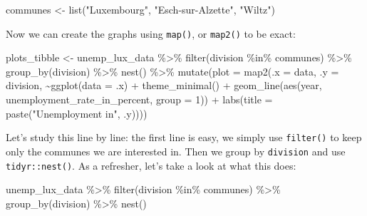 \documentclass[
]{article}
\newenvironment{Shaded}{\begin{snugshade}}{\end{snugshade}}
\newcommand{\AttributeTok}[1]{\textcolor[rgb]{0.77,0.63,0.00}{#1}}
\newcommand{\DecValTok}[1]{\textcolor[rgb]{0.00,0.00,0.81}{#1}}
\newcommand{\FunctionTok}[1]{\textcolor[rgb]{0.00,0.00,0.00}{#1}}
\newcommand{\NormalTok}[1]{#1}
\newcommand{\OtherTok}[1]{\textcolor[rgb]{0.56,0.35,0.01}{#1}}
\newcommand{\SpecialCharTok}[1]{\textcolor[rgb]{0.00,0.00,0.00}{#1}}
\newcommand{\StringTok}[1]{\textcolor[rgb]{0.31,0.60,0.02}{#1}}
\begin{document}
\begin{Shaded}
\begin{Highlighting}[]
\NormalTok{communes }\OtherTok{\textless{}{-}} \FunctionTok{list}\NormalTok{(}\StringTok{"Luxembourg"}\NormalTok{, }\StringTok{"Esch{-}sur{-}Alzette"}\NormalTok{, }\StringTok{"Wiltz"}\NormalTok{)}
\end{Highlighting}
\end{Shaded}

Now we can create the graphs using \texttt{map()}, or \texttt{map2()} to be exact:

\begin{Shaded}
\begin{Highlighting}[]
\NormalTok{plots\_tibble }\OtherTok{\textless{}{-}}\NormalTok{ unemp\_lux\_data }\SpecialCharTok{\%\textgreater{}\%}
  \FunctionTok{filter}\NormalTok{(division }\SpecialCharTok{\%in\%}\NormalTok{ communes) }\SpecialCharTok{\%\textgreater{}\%}
  \FunctionTok{group\_by}\NormalTok{(division) }\SpecialCharTok{\%\textgreater{}\%}
  \FunctionTok{nest}\NormalTok{() }\SpecialCharTok{\%\textgreater{}\%}
  \FunctionTok{mutate}\NormalTok{(}\AttributeTok{plot =} \FunctionTok{map2}\NormalTok{(}\AttributeTok{.x =}\NormalTok{ data, }\AttributeTok{.y =}\NormalTok{ division, }\SpecialCharTok{\textasciitilde{}}\FunctionTok{ggplot}\NormalTok{(}\AttributeTok{data =}\NormalTok{ .x) }\SpecialCharTok{+}
       \FunctionTok{theme\_minimal}\NormalTok{() }\SpecialCharTok{+}
       \FunctionTok{geom\_line}\NormalTok{(}\FunctionTok{aes}\NormalTok{(year, unemployment\_rate\_in\_percent, }\AttributeTok{group =} \DecValTok{1}\NormalTok{)) }\SpecialCharTok{+}
       \FunctionTok{labs}\NormalTok{(}\AttributeTok{title =} \FunctionTok{paste}\NormalTok{(}\StringTok{"Unemployment in"}\NormalTok{, .y))))}
\end{Highlighting}
\end{Shaded}

Let's study this line by line: the first line is easy, we simply use \texttt{filter()} to keep only the
communes we are interested in. Then we group by \texttt{division} and use \texttt{tidyr::nest()}. As a refresher,
let's take a look at what this does:

\begin{Shaded}
\begin{Highlighting}[]
\NormalTok{unemp\_lux\_data }\SpecialCharTok{\%\textgreater{}\%}
  \FunctionTok{filter}\NormalTok{(division }\SpecialCharTok{\%in\%}\NormalTok{ communes) }\SpecialCharTok{\%\textgreater{}\%}
  \FunctionTok{group\_by}\NormalTok{(division) }\SpecialCharTok{\%\textgreater{}\%}
  \FunctionTok{nest}\NormalTok{()}
\end{Highlighting}
\end{Shaded}
\end{document}
